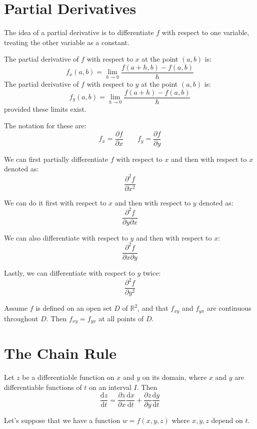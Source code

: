 \documentclass[../calc3.tex]{subfiles}
\begin{document}
\section{Partial Derivatives}
The idea of a partial derivative is to differentiate $f$ with respect to one variable, treating the other variable as a constant.
\begin{definition}
    The partial derivative of $f$ with respect to $x$ at the point $(a,b)$ is:
    \[f_x(a,b)=\lim_{h\to 0}\frac{f(a+h,b)-f(a,b)}{h}\]
    The partial derivative of $f$ with respect to $y$ at the point $(a,b)$ is:
    \[f_y(a,b)=\lim_{h\to 0}\frac{f(a+h)-f(a,b)}{h}\]
    provided these limits exist.

    The notation for these are:
    \[f_x = \frac{\partial f}{\partial x} \qquad f_y=\frac{\partial f}{\partial y}\]
\end{definition}

We can first partially differentiate $f$ with respect to $x$ and then with respect to $x$ denoted as:
\[\frac{\partial^2f}{\partial x^2}\]

We can do it first with respect to $x$ and then with respect to $y$ denoted as:
\[\frac{\partial^2f}{\partial y \partial x}\]

We can also differentiate with respect to $y$ and then with respect to $x$:
\[\frac{\partial^2f}{\partial x \partial y}\]

Lastly, we can differentiate with respect to $y$ twice:
\[\frac{\partial^2f}{\partial y^2}\]

\begin{theorem}
    Assume $f$ is defined on an open set $D$ of $\mathbb{R}^2$, and that $f_{xy}$
    and $f_{yx}$ are continuous throughout $D$. Then $f_{xy}=f_{yx}$ at all points of $D$. 
\end{theorem}

\section{The Chain Rule}
\begin{theorem}
    Let $z$ be a differentiable function on $x$ and $y$ on its domain, where $x$ and $y$ are differentiable functions
    of $t$ on an interval $I$. Then
    \[\frac{\mathrm{d}z}{\mathrm{d}t}=\frac{\partial{z}}{\partial{x}}\frac{\mathrm{d}x}{\mathrm{d}t}+\frac{\partial z}{\partial y}\frac{\mathrm{d}y}{\mathrm{d}t}\]
\end{theorem}

Let's suppose that we have a function $w=f(x,y,z)$ where $x,y,z$ depend on $t$.
\end{document}

